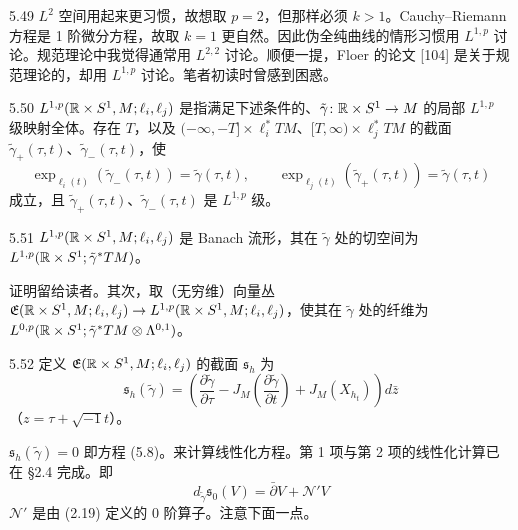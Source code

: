 
\begin{remark}{5.49}
  $L^2$ 空间用起来更习惯，故想取 $p=2$，但那样必须 $k>1$。Cauchy–Riemann 方程是 1 阶微分方程，故取 $k=1$ 更自然。因此伪全纯曲线的情形习惯用 $L^{1,p}$ 讨论。规范理论中我觉得通常用 $L^{2,2}$ 讨论。顺便一提，Floer 的论文 [104] 是关于规范理论的，却用 $L^{1,p}$ 讨论。笔者初读时曾感到困惑。
\end{remark}

\begin{definition}{5.50}
  $L^{1,p}(\mathbb{R}\times S^1,M;\ell_i,\ell_j)$ 是指满足下述条件的、$\tilde\gamma\colon\mathbb{R}\times S^1\to M$ 的局部 $L^{1,p}$ 级映射全体。存在 $T$，以及 $(-\infty,-T]\times\ell_i^*TM$、$[T,\infty)\times\ell_j^*TM$ 的截面 $\tilde\gamma_+(\tau,t)$、$\tilde\gamma_-(\tau,t)$，使
  \[
    \exp_{\ell_i(t)}(\tilde\gamma_-(\tau,t))=\tilde\gamma(\tau,t),\qquad
    \exp_{\ell_j(t)}(\tilde\gamma_+(\tau,t))=\tilde\gamma(\tau,t)
  \]
  成立，且 $\tilde\gamma_+(\tau,t)$、$\tilde\gamma_-(\tau,t)$ 是 $L^{1,p}$ 级。
\end{definition}

\begin{lemma}{5.51}
  $L^{1,p}(\mathbb{R}\times S^1,M;\ell_i,\ell_j)$ 是 Banach 流形，其在 $\tilde\gamma$ 处的切空间为 $L^{1,p}(\mathbb{R}\times S^1;\tilde\gamma^*TM)$。
\end{lemma}

证明留给读者。其次，取（无穷维）向量丛 $\mathfrak{E}(\mathbb{R}\times S^1,M;\ell_i,\ell_j)\to L^{1,p}(\mathbb{R}\times S^1,M;\ell_i,\ell_j)$，使其在 $\tilde\gamma$ 处的纤维为 $L^{0,p}(\mathbb{R}\times S^1;\tilde\gamma^*TM\otimes\Lambda^{0,1})$。

\begin{definition}{5.52}
  定义 $\mathfrak{E}(\mathbb{R}\times S^1,M;\ell_i,\ell_j)$ 的截面 $\mathfrak{s}_h$ 为
  \[
    \mathfrak{s}_h(\tilde\gamma)
    =\left(\frac{\partial\tilde\gamma}{\partial\tau}
      -J_M\left(\frac{\partial\tilde\gamma}{\partial t}\right)
      +J_M(X_{h_t})\right)d\bar z
  \]
  （$z=\tau+\sqrt{-1}t$）。
\end{definition}

$\mathfrak{s}_h(\tilde\gamma)=0$ 即方程 (5.8)。来计算线性化方程。第 1 项与第 2 项的线性化计算已在 §2.4 完成。即
\begin{equation}
  d_{\tilde\gamma}\mathfrak{s}_0(V)=\bar\partial V+\mathcal{N}'V \tag{5.9}
\end{equation}
$\mathcal{N}'$ 是由 (2.19) 定义的 0 阶算子。注意下面一点。

